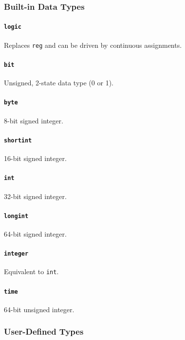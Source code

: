 \subsubsection{Built-in Data Types}
\paragraph{\texttt{logic}} Replaces \texttt{reg} and can be driven by continuous assignments.

\paragraph{\texttt{bit}} Unsigned, 2-state data type (0 or 1).

\paragraph{\texttt{byte}} 8-bit signed integer.

\paragraph{\texttt{shortint}} 16-bit signed integer.

\paragraph{\texttt{int}} 32-bit signed integer.

\paragraph{\texttt{longint}} 64-bit signed integer.

\paragraph{\texttt{integer}} Equivalent to \texttt{int}.

\paragraph{\texttt{time}} 64-bit unsigned integer.

\subsubsection{User-Defined Types}
